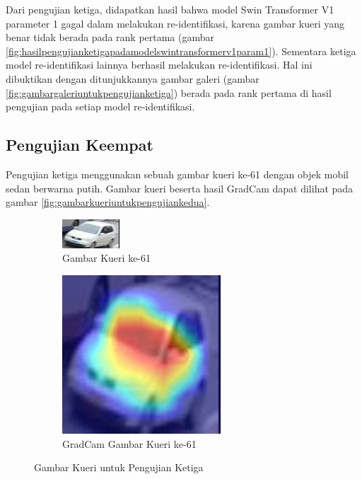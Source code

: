 Dari pengujian ketiga, didapatkan hasil bahwa model Swin Transformer V1 parameter 1 gagal dalam melakukan re-identifikasi, 
karena gambar kueri yang benar tidak berada pada rank pertama (gambar 
\ref{fig:hasilpengujianketigapadamodelswintransformerv1param1}). Sementara ketiga model re-identifikasi lainnya berhasil 
melakukan re-identifikasi. Hal ini dibuktikan dengan ditunjukkannya gambar galeri (gambar \ref{fig:gambargaleriuntukpengujianketiga})
berada pada rank pertama di hasil pengujian pada setiap model re-identifikasi.

\subsection{Pengujian Keempat}

Pengujian ketiga menggunakan sebuah gambar kueri ke-61 dengan objek mobil sedan berwarna putih. Gambar kueri 
beserta hasil GradCam dapat dilihat pada gambar \ref{fig:gambarkueriuntukpengujiankedua}.

\begin{figure}[h!]
  \centering
  \begin{subfigure}{.5\textwidth}
    \centering
    \includegraphics[width=.4\linewidth]{gambar/Que61_1120.jpg}
    \caption{Gambar Kueri ke-61}
    \label{gambarkuerinomorenamsatu}
  \end{subfigure}%
  \begin{subfigure}{.5\textwidth}
    \centering
    \includegraphics[width=.4\linewidth]{gambar/GradCamQue61_1120.jpg}
    \caption{GradCam Gambar Kueri ke-61}
    \label{gradcamgambarkuerinomorenamsatu}
  \end{subfigure}
  \caption{Gambar Kueri untuk Pengujian Ketiga}
  \label{fig:gambarkueriuntukpengujianketiga}
\end{figure}

